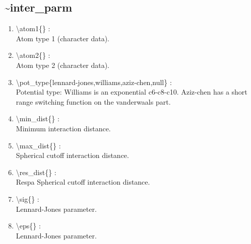 \documentclass[12pt,titlepage]{article}
\begin{document}

\newpage
\subsection*{\bf \~{}inter\_parm}

\begin{enumerate}

 \vspace{0.15in} 
 \item  \textbackslash{}atom1\{\} : \\ 
    Atom type 1 (character data).

 \vspace{0.15in} 
 \item  \textbackslash{}atom2\{\} : \\ 
    Atom type 2 (character data).

 \vspace{0.15in} 
 \item  \textbackslash{}pot\_type\{lennard-jones,williams,aziz-chen,null\} : \\ 
    Potential type: Williams is an exponential c6-c8-c10. Aziz-chen has
    a short range switching function on the vanderwaals part.

 \vspace{0.15in} 
 \item  \textbackslash{}min\_dist\{\} : \\ 
    Minimum interaction distance.

 \vspace{0.15in} 
 \item  \textbackslash{}max\_dist\{\} : \\ 
    Spherical cutoff interaction distance.

 \vspace{0.15in} 
 \item  \textbackslash{}res\_dist\{\} : \\ 
    Respa Spherical cutoff interaction distance.

 \vspace{0.15in} 
 \item  \textbackslash{}sig\{\} : \\ 
    Lennard-Jones parameter.

 \vspace{0.15in} 
 \item  \textbackslash{}eps\{\} : \\ 
    Lennard-Jones parameter.


\end{enumerate}
\end{document}
